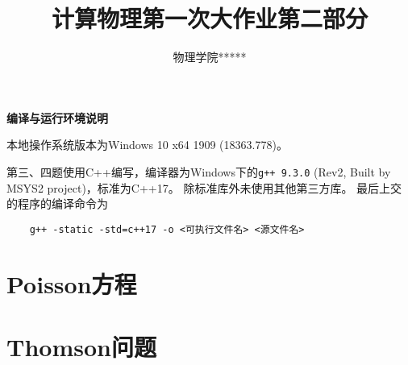 \documentclass[a4paper,unicode]{report}
\title{计算物理第一次大作业第二部分}
\author{物理学院\quad ***\quad 1800011***}
\newcommand{\chapterendname}{章}
\begin{document}
\maketitle
\tableofcontents

\begin{center}
    \textbf{编译与运行环境说明}
\end{center}

本地操作系统版本为\textsf{Windows 10 x64 1909 (18363.778)}。

第三、四题使用\textsf{C++}编写，编译器为Windows下的\texttt{g++ 9.3.0} (Rev2, Built by MSYS2 project)，标准为\textsf{C++17}。
除标准库外未使用其他第三方库。
最后上交的程序的编译命令为\begin{verbatim}
    g++ -static -std=c++17 -o <可执行文件名> <源文件名>
\end{verbatim}

\setcounter{chapter}{2}
\chapter{Poisson方程}


\chapter{Thomson问题}



% 
\end{document}
